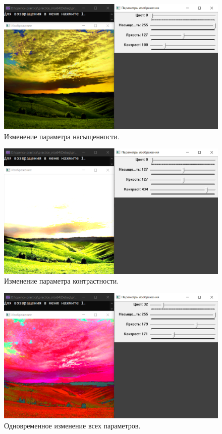 \documentclass[12pt,a4paper]{scrartcl}
\begin{document}
\begin{figure}
 \centering
 \includegraphics[width=1\textwidth]{image_edit_saturation.png}
 \caption{Изменение параметра насыщенности.}\label{fig:par}
\end{figure}

\begin{figure}
 \centering
 \includegraphics[width=1\textwidth]{image_edit_contrast.png}
 \caption{Изменение параметра контрастности.}\label{fig:par}
\end{figure}

\begin{figure}
 \centering
 \includegraphics[width=1\textwidth]{image_edit_allparameters.png}
 \caption{Одновременное изменение всех параметров.}\label{fig:par}
\end{figure}
\end{document}
